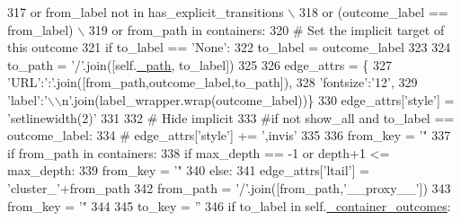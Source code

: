 \begin{DoxyCode}
{{{{{317                         \textcolor{keywordflow}{or} from\_label \textcolor{keywordflow}{not} \textcolor{keywordflow}{in} has\_explicit\_transitions \(\backslash\)
318                         \textcolor{keywordflow}{or} (outcome\_label == from\_label) \(\backslash\)
319                         \textcolor{keywordflow}{or} from\_path \textcolor{keywordflow}{in} containers:
320                     \textcolor{comment}{# Set the implicit target of this outcome}
321                     \textcolor{keywordflow}{if} to\_label == \textcolor{stringliteral}{'None'}:
322                         to\_label = outcome\_label
323 
324                     to\_path = \textcolor{stringliteral}{'/'}.join([self.\hyperlink{classsmacc__viewer_1_1ContainerNode_ae600e450e4ccfa137937076c391ded72}{\_path}, to\_label])
325 
326                     edge\_attrs = \{
327                             \textcolor{stringliteral}{'URL'}:\textcolor{stringliteral}{':'}.join([from\_path,outcome\_label,to\_path]),
328                             \textcolor{stringliteral}{'fontsize'}:\textcolor{stringliteral}{'12'},
329                             \textcolor{stringliteral}{'label'}:\textcolor{stringliteral}{'\(\backslash\)\(\backslash\)n'}.join(label\_wrapper.wrap(outcome\_label))\}
330                     edge\_attrs[\textcolor{stringliteral}{'style'}] = \textcolor{stringliteral}{'setlinewidth(2)'}
331 
332                     \textcolor{comment}{# Hide implicit}
333                     \textcolor{comment}{#if not show\_all and to\_label == outcome\_label:}
334                     \textcolor{comment}{#    edge\_attrs['style'] += ',invis'}
335 
336                     from\_key = \textcolor{stringliteral}{'"%
337                     \textcolor{keywordflow}{if} from\_path \textcolor{keywordflow}{in} containers:
338                         \textcolor{keywordflow}{if} max\_depth == -1 \textcolor{keywordflow}{or} depth+1 <= max\_depth:
339                             from\_key = \textcolor{stringliteral}{'"%
340                         \textcolor{keywordflow}{else}:
341                             edge\_attrs[\textcolor{stringliteral}{'ltail'}] = \textcolor{stringliteral}{'cluster\_'}+from\_path
342                             from\_path = \textcolor{stringliteral}{'/'}.join([from\_path,\textcolor{stringliteral}{'\_\_proxy\_\_'}])
343                             from\_key = \textcolor{stringliteral}{'"%
344 
345                     to\_key = \textcolor{stringliteral}{''}
346                     \textcolor{keywordflow}{if} to\_label \textcolor{keywordflow}{in} self.\hyperlink{classsmacc__viewer_1_1ContainerNode_afc173014e336c7c3ab6a5d2dd1798d63}{\_container\_outcomes}:
}}}}}}}}
\end{DoxyCode}
